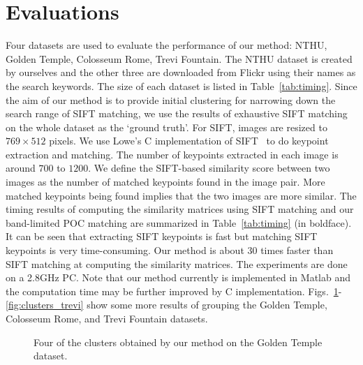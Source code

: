 \documentclass[conference]{IEEEtran}
\begin{document}
\section{Evaluations}
\label{sec:evaluations}

Four datasets are used to evaluate the performance of our method: {\sf NTHU}, {\sf Golden Temple}, {\sf Colosseum Rome}, {\sf Trevi Fountain}. The {\sf NTHU} dataset is created by ourselves and the other three are downloaded from Flickr using their names as the search keywords. The size of each dataset is listed in Table~\ref{tab:timing}. Since the aim of our method is to provide initial clustering for narrowing down the search range of SIFT matching, we use the results of exhaustive SIFT matching on the whole dataset as the `ground truth'. 
For SIFT, images are resized to $769\times 512$ pixels. We use Lowe's C implementation of SIFT~\cite{Lowe04} to do keypoint extraction and matching. The number of keypoints extracted in each image is around $700$ to $1200$. 
We define the SIFT-based similarity score between two images as the number of matched keypoints found in the image pair. More matched keypoints being found implies that the two images are more similar.
The timing results of computing the similarity matrices using SIFT matching and our band-limited POC matching are summarized in Table~\ref{tab:timing} (in boldface). It can be seen that extracting SIFT keypoints is fast but matching SIFT keypoints is very time-consuming. Our method is about $30$ times faster than SIFT matching at computing the similarity matrices. The experiments are done on a 2.8GHz PC. Note that our method currently is implemented in Matlab and the computation time may be further improved by C implementation. Figs.~\ref{fig:clusters_golden}-\ref{fig:clusters_trevi} show some more results of grouping the {\sf Golden Temple}, {\sf Colosseum Rome}, and  {\sf Trevi Fountain} datasets.


\begin{figure}
\centering
{}
\caption{Four of the clusters obtained by our method on the {\sf Golden Temple} dataset.}
\label{fig:clusters_golden}
\end{figure}
\end{document}
